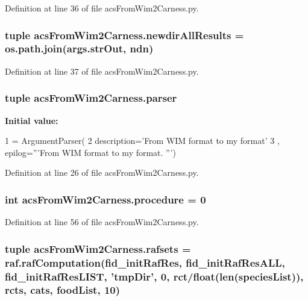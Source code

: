 Definition at line 36 of file acs\-From\-Wim2\-Carness.\-py.

\hypertarget{a00094_a4af2fb5abbd4a6e8930401e66af5b79d}{
\subsubsection[{newdir\-All\-Results}]{\setlength{\rightskip}{0pt plus 5cm}tuple acs\-From\-Wim2\-Carness.\-newdir\-All\-Results = os.\-path.\-join(args.\-str\-Out, {\bf ndn})}}\label{a00094_a4af2fb5abbd4a6e8930401e66af5b79d}


Definition at line 37 of file acs\-From\-Wim2\-Carness.\-py.

\hypertarget{a00094_aed93287ef2c9a4a9ba68f8ffc75aae17}{
\subsubsection[{parser}]{\setlength{\rightskip}{0pt plus 5cm}tuple acs\-From\-Wim2\-Carness.\-parser}}\label{a00094_aed93287ef2c9a4a9ba68f8ffc75aae17}
{\bfseries Initial value\-:}
\begin{DoxyCode}
1 = ArgumentParser(
2                                 description=\textcolor{stringliteral}{'From WIM format to my format'}
3                                 , epilog=\textcolor{stringliteral}{'''From WIM format to my format. '''})
\end{DoxyCode}


Definition at line 26 of file acs\-From\-Wim2\-Carness.\-py.

\hypertarget{a00094_ac84174dad0b933ca88ebdb79cf3497ec}{
\subsubsection[{procedure}]{\setlength{\rightskip}{0pt plus 5cm}int acs\-From\-Wim2\-Carness.\-procedure = 0}}\label{a00094_ac84174dad0b933ca88ebdb79cf3497ec}


Definition at line 56 of file acs\-From\-Wim2\-Carness.\-py.

\hypertarget{a00094_a36370edf2a6a4e19f0a99413aac43096}{
\subsubsection[{rafsets}]{\setlength{\rightskip}{0pt plus 5cm}tuple acs\-From\-Wim2\-Carness.\-rafsets = raf.\-raf\-Computation({\bf fid\-\_\-init\-Raf\-Res}, {\bf fid\-\_\-init\-Raf\-Res\-A\-L\-L}, {\bf fid\-\_\-init\-Raf\-Res\-L\-I\-S\-T}, 'tmp\-Dir', 0, {\bf rct}/float(len({\bf species\-List})), rcts, {\bf cats}, {\bf food\-List}, 10)}}\label{a00094_a36370edf2a6a4e19f0a99413aac43096}


